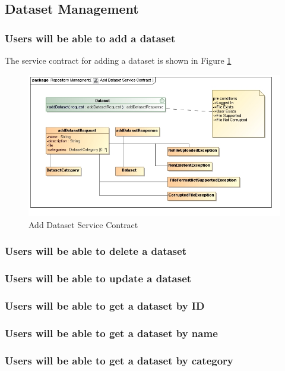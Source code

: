 \subsection{Dataset Management}

\subsubsection {Users will be able to add a dataset}
The service contract for adding a dataset is shown in Figure \ref{fig:addDatasetService}
\begin{figure}[H]
  \begin{center}
  \includegraphics[scale=0.6]{../Diagrams and Charts/Test Data/Add Dataset Service Contract.jpg}
  \caption{Add Dataset Service Contract}
  \end{center}
  \label{fig:addDatasetService}
\end{figure}

\subsubsection {Users will be able to delete a dataset}
\subsubsection {Users will be able to update a dataset}
\subsubsection {Users will be able to get a dataset by ID}
\subsubsection {Users will be able to get a dataset by name}
\subsubsection {Users will be able to get a dataset by category}
